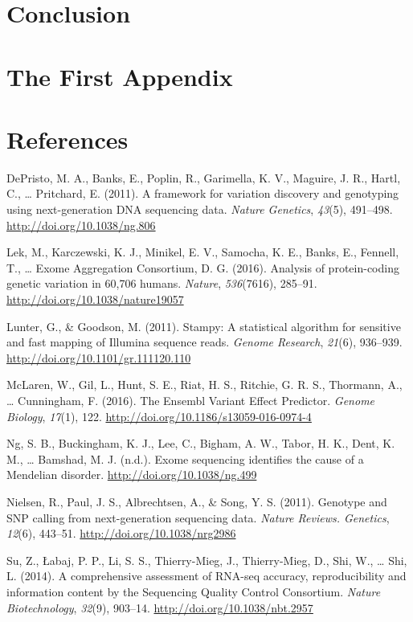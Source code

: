 \documentclass[12pt,twoside]{reedthesis}
\theoremstyle{definition}
\theoremstyle{definition}
\theoremstyle{remark}
\begin{document}
  \chapter*{Conclusion}\label{conclusion}
  
  \chapter{The First Appendix}\label{the-first-appendix}
  
  \chapter*{References}\label{references}
  
  \hypertarget{refs}{}
  \hypertarget{ref-DePristo2011}{}
  DePristo, M. A., Banks, E., Poplin, R., Garimella, K. V., Maguire, J.
  R., Hartl, C., \ldots{} Pritchard, E. (2011). A framework for variation
  discovery and genotyping using next-generation DNA sequencing data.
  \emph{Nature Genetics}, \emph{43}(5), 491--498.
  \url{http://doi.org/10.1038/ng.806}
  
  \hypertarget{ref-Lek2016}{}
  Lek, M., Karczewski, K. J., Minikel, E. V., Samocha, K. E., Banks, E.,
  Fennell, T., \ldots{} Exome Aggregation Consortium, D. G. (2016).
  Analysis of protein-coding genetic variation in 60,706 humans.
  \emph{Nature}, \emph{536}(7616), 285--91.
  \url{http://doi.org/10.1038/nature19057}
  
  \hypertarget{ref-Lunter2011}{}
  Lunter, G., \& Goodson, M. (2011). Stampy: A statistical algorithm for
  sensitive and fast mapping of Illumina sequence reads. \emph{Genome
  Research}, \emph{21}(6), 936--939.
  \url{http://doi.org/10.1101/gr.111120.110}
  
  \hypertarget{ref-McLaren2016}{}
  McLaren, W., Gil, L., Hunt, S. E., Riat, H. S., Ritchie, G. R. S.,
  Thormann, A., \ldots{} Cunningham, F. (2016). The Ensembl Variant Effect
  Predictor. \emph{Genome Biology}, \emph{17}(1), 122.
  \url{http://doi.org/10.1186/s13059-016-0974-4}
  
  \hypertarget{ref-Ng}{}
  Ng, S. B., Buckingham, K. J., Lee, C., Bigham, A. W., Tabor, H. K.,
  Dent, K. M., \ldots{} Bamshad, M. J. (n.d.). Exome sequencing identifies
  the cause of a Mendelian disorder. \url{http://doi.org/10.1038/ng.499}
  
  \hypertarget{ref-Nielsen2011}{}
  Nielsen, R., Paul, J. S., Albrechtsen, A., \& Song, Y. S. (2011).
  Genotype and SNP calling from next-generation sequencing data.
  \emph{Nature Reviews. Genetics}, \emph{12}(6), 443--51.
  \url{http://doi.org/10.1038/nrg2986}
  
  \hypertarget{ref-Su2014}{}
  Su, Z., Łabaj, P. P., Li, S. S., Thierry-Mieg, J., Thierry-Mieg, D.,
  Shi, W., \ldots{} Shi, L. (2014). A comprehensive assessment of RNA-seq
  accuracy, reproducibility and information content by the Sequencing
  Quality Control Consortium. \emph{Nature Biotechnology}, \emph{32}(9),
  903--14. \url{http://doi.org/10.1038/nbt.2957}


\end{document}

